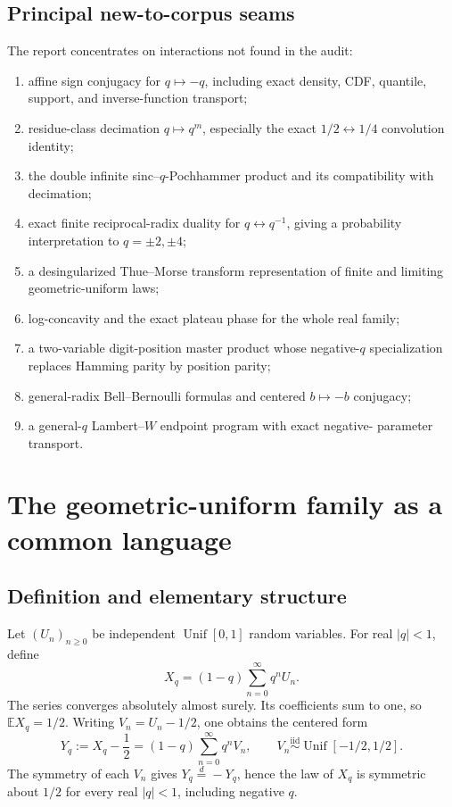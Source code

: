 \documentclass[11pt,oneside]{article}
\theoremstyle{definition}
\theoremstyle{remark}
\newcommand{\E}{\mathbb E}
\newcommand{\Unif}{\operatorname{Unif}}
\begin{document}
\subsection{Principal new-to-corpus seams}
The report concentrates on interactions not found in the audit:
\begin{enumerate}
\item affine sign conjugacy for \(q\mapsto-q\), including exact density, CDF,
  quantile, support, and inverse-function transport;
\item residue-class decimation \(q\mapsto q^m\), especially the exact
  \(1/2\leftrightarrow1/4\) convolution identity;
\item the double infinite sinc--\(q\)-Pochhammer product and its compatibility
  with decimation;
\item exact finite reciprocal-radix duality for \(q\leftrightarrow q^{-1}\),
  giving a probability interpretation to \(q=\pm2,\pm4\);
\item a desingularized Thue--Morse transform representation of finite and
  limiting geometric-uniform laws;
\item log-concavity and the exact plateau phase for the whole real family;
\item a two-variable digit-position master product whose negative-\(q\)
  specialization replaces Hamming parity by position parity;
\item general-radix Bell--Bernoulli formulas and centered \(b\mapsto-b\)
  conjugacy;
\item a general-\(q\) Lambert--\(W\) endpoint program with exact negative-
  parameter transport.
\end{enumerate}

\section{The geometric-uniform family as a common language}

\subsection{Definition and elementary structure}
Let \((U_n)_{n\ge0}\) be independent \(\Unif[0,1]\) random variables.  For real
\(|q|<1\), define
\begin{equation}\label{eq:Xq-def}
 X_q=(1-q)\sum_{n=0}^{\infty}q^nU_n.
\end{equation}
The series converges absolutely almost surely.  Its coefficients sum to one,
so \(\E X_q=1/2\).  Writing \(V_n=U_n-1/2\), one obtains the centered form
\begin{equation}\label{eq:centered-series}
 Y_q:=X_q-\frac12=(1-q)\sum_{n=0}^{\infty}q^nV_n,
 \qquad V_n\stackrel{\mathrm{iid}}{\sim}\Unif[-1/2,1/2].
\end{equation}
The symmetry of each \(V_n\) gives \(Y_q\stackrel d=-Y_q\), hence the law of
\(X_q\) is symmetric about \(1/2\) for every real \(|q|<1\), including negative
\(q\).
\end{document}
